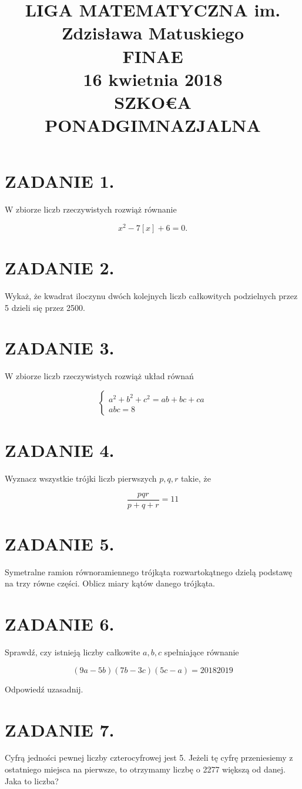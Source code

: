 \documentclass[10pt]{article}
\title{LIGA MATEMATYCZNA im. Zdzisława Matuskiego \\
 FINAE \\
 16 kwietnia 2018 \\
 SZKO€A PONADGIMNAZJALNA }
\author{}
\date{}
\begin{document}
\maketitle
\section*{ZADANIE 1.}
W zbiorze liczb rzeczywistych rozwiąż równanie

\[
x^{2}-7[x]+6=0 .
\]

\section*{ZADANIE 2.}
Wykaż, że kwadrat iloczynu dwóch kolejnych liczb całkowitych podzielnych przez 5 dzieli się przez 2500.

\section*{ZADANIE 3.}
W zbiorze liczb rzeczywistych rozwiąż układ równań

\[
\left\{\begin{array}{l}
a^{2}+b^{2}+c^{2}=a b+b c+c a \\
a b c=8
\end{array}\right.
\]

\section*{ZADANIE 4.}
Wyznacz wszystkie trójki liczb pierwszych \(p, q, r\) takie, że

\[
\frac{p q r}{p+q+r}=11
\]

\section*{ZADANIE 5.}
Symetralne ramion równoramiennego trójkąta rozwartokątnego dzielą podstawę na trzy równe części. Oblicz miary kątów danego trójkąta.

\section*{ZADANIE 6.}
Sprawdź, czy istnieją liczby całkowite \(a, b, c\) spełniające równanie

\[
(9 a-5 b)(7 b-3 c)(5 c-a)=20182019
\]

Odpowiedź uzasadnij.

\section*{ZADANIE 7.}
Cyfrą jedności pewnej liczby czterocyfrowej jest 5. Jeżeli tę cyfrę przeniesiemy z ostatniego miejsca na pierwsze, to otrzymamy liczbę o 2277 większą od danej. Jaka to liczba?
\end{document}
